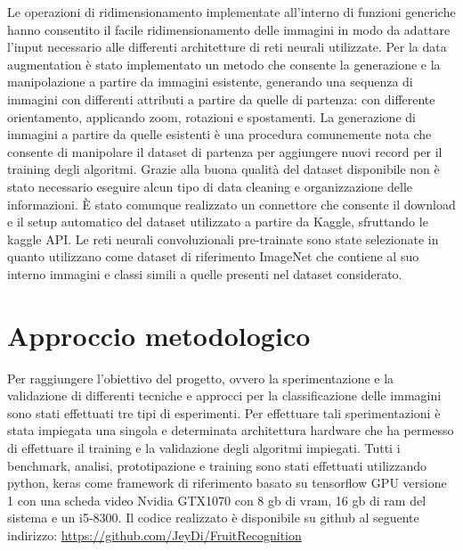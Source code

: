 Le operazioni di ridimensionamento implementate all'interno di funzioni generiche hanno consentito il facile ridimensionamento delle immagini in modo da adattare l'input necessario alle differenti architetture di reti neurali utilizzate.  
Per la data augmentation è stato implementato un metodo che consente la generazione e la manipolazione a partire da immagini esistente, generando una sequenza di immagini con differenti attributi a partire da quelle di partenza: con differente orientamento, applicando zoom, rotazioni e spostamenti.  
La generazione di immagini a partire da quelle esistenti è una procedura comunemente nota che consente di manipolare il dataset di partenza per aggiungere nuovi record per il training degli algoritmi. \cite{dataaugmentation}  
Grazie alla buona qualità del dataset disponibile non è stato necessario eseguire alcun tipo di data cleaning e organizzazione delle informazioni.  
È stato comunque realizzato un connettore che consente il download e il setup automatico del dataset utilizzato a partire da Kaggle, sfruttando le kaggle API. \bigskip
Le reti neurali convoluzionali pre-trainate sono state selezionate in quanto utilizzano come dataset di riferimento ImageNet che contiene al suo interno immagini e classi simili a quelle presenti nel dataset considerato.  


\section{Approccio metodologico}

Per raggiungere l'obiettivo del progetto, ovvero la sperimentazione e la validazione di differenti tecniche e approcci per la classificazione delle immagini sono stati effettuati tre tipi di esperimenti.  
Per effettuare tali sperimentazioni è stata impiegata una singola e determinata architettura hardware che ha permesso di effettuare il training e la validazione degli algoritmi impiegati.  
Tutti i benchmark, analisi, prototipazione e training sono stati effettuati utilizzando python, keras come framework di riferimento basato su tensorflow GPU versione 1 con una scheda video Nvidia GTX1070 con 8 gb di vram, 16 gb di ram del sistema e un i5-8300.  
Il codice realizzato è disponibile su github al seguente indirizzo:  \url{https://github.com/JeyDi/FruitRecognition} \bigskip

